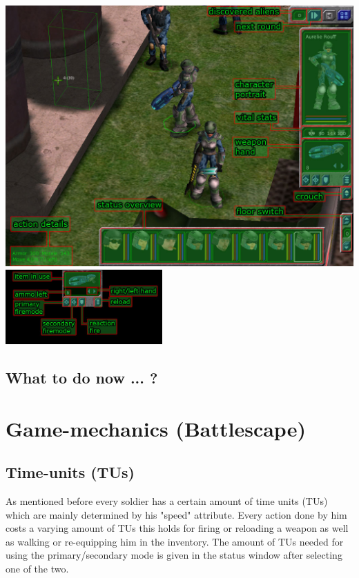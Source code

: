 \includegraphics[width=\textwidth]{images/altHUD_final.jpg}\\
\includegraphics[width=6cm]{images/altHUD_detail_final.jpg}


\subsection{What to do now ... ?}

\section{Game-mechanics (Battlescape)}

\subsection{Time-units (TUs)}
As mentioned before every soldier has a certain amount of time units (TUs) which are mainly determined by his "speed" attribute. Every action done by him costs a varying amount of TUs this holds for firing or reloading a weapon as well as walking or re-equipping him in the inventory. The amount of TUs needed for using the primary/secondary mode is given in the status window after selecting one of the two.

